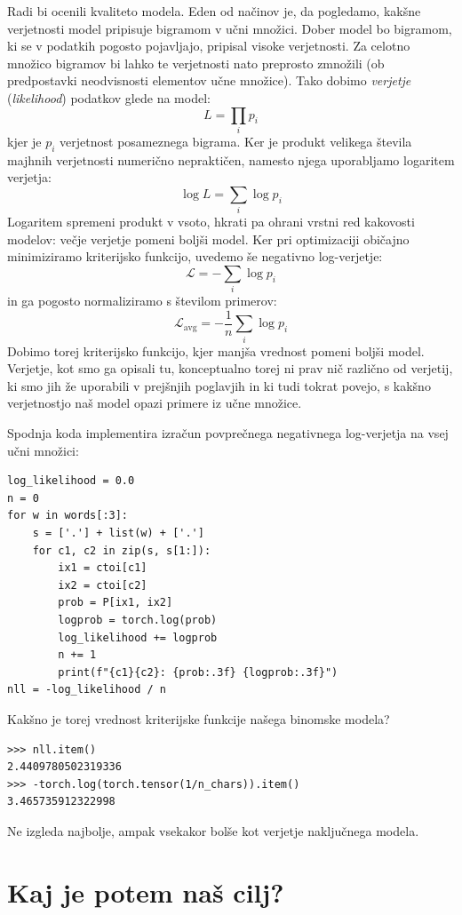 Radi bi ocenili kvaliteto modela. Eden od načinov je, da pogledamo, kakšne verjetnosti model pripisuje bigramom v učni množici. Dober model bo bigramom, ki se v podatkih pogosto pojavljajo, pripisal visoke verjetnosti. Za celotno množico bigramov bi lahko te verjetnosti nato preprosto zmnožili (ob predpostavki neodvisnosti elementov učne množice). Tako dobimo \emph{verjetje} (\textit{likelihood}) podatkov glede na model:
\[
L = \prod_i p_i
\]
kjer je $p_i$ verjetnost posameznega bigrama. Ker je produkt velikega števila majhnih verjetnosti numerično nepraktičen, namesto njega uporabljamo logaritem verjetja:
\[
\log L = \sum_i \log p_i
\]
Logaritem spremeni produkt v vsoto, hkrati pa ohrani vrstni red kakovosti modelov: večje verjetje pomeni boljši model. Ker pri optimizaciji običajno minimiziramo kriterijsko funkcijo, uvedemo še negativno log-verjetje:
\[
\mathcal{L} = - \sum_i \log p_i
\]
in ga pogosto normaliziramo s številom primerov:
\[
\mathcal{L}_{\text{avg}} = - \frac{1}{n} \sum_i \log p_i
\]
Dobimo torej kriterijsko funkcijo, kjer manjša vrednost pomeni boljši model. Verjetje, kot smo ga opisali tu, konceptualno torej ni prav nič različno od verjetij, ki smo jih že uporabili v prejšnjih poglavjih in ki tudi tokrat povejo, s kakšno verjetnostjo naš model opazi primere iz učne množice.

Spodnja koda implementira izračun povprečnega negativnega log-verjetja na vsej učni množici:

\vspace*{3mm}
\begin{lstlisting}
log_likelihood = 0.0
n = 0
for w in words[:3]:
    s = ['.'] + list(w) + ['.']
    for c1, c2 in zip(s, s[1:]):
        ix1 = ctoi[c1]
        ix2 = ctoi[c2]
        prob = P[ix1, ix2]
        logprob = torch.log(prob)
        log_likelihood += logprob
        n += 1
        print(f"{c1}{c2}: {prob:.3f} {logprob:.3f}")
nll = -log_likelihood / n
\end{lstlisting}

Kakšno je torej vrednost kriterijske funkcije našega binomske modela?

\vspace*{3mm}
\begin{lstlisting}
>>> nll.item()
2.4409780502319336
>>> -torch.log(torch.tensor(1/n_chars)).item()
3.465735912322998
\end{lstlisting}
Ne izgleda najbolje, ampak vsekakor bolše kot verjetje naključnega modela.

\section{Kaj je potem naš cilj?}

